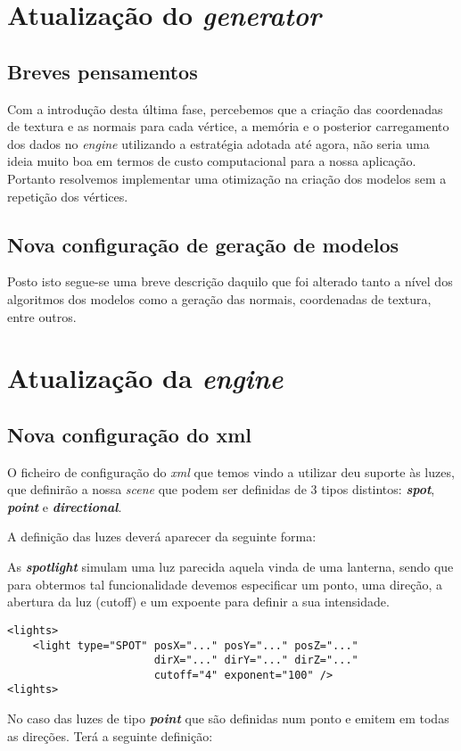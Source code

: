 \documentclass[11pt,a4paper]{report}
\begin{document}
\chapter{Atualização do \emph{generator}}
\section{Breves pensamentos}
Com a introdução desta última fase, percebemos que a criação das coordenadas de textura e as normais para cada vértice, a memória e o posterior carregamento dos dados no \emph{engine} utilizando a estratégia adotada até agora, não seria uma ideia muito boa em termos de custo computacional para a nossa aplicação. Portanto resolvemos implementar uma otimização na criação dos modelos sem a repetição dos vértices.
\section{Nova configuração de geração de modelos}

Posto isto segue-se uma breve descrição daquilo que foi alterado tanto a nível dos algoritmos dos modelos como a geração das normais, coordenadas de textura, entre outros.

\chapter{Atualização da \emph{engine}}

\section{Nova configuração do xml}
O ficheiro de configuração do \emph{xml} que temos vindo a utilizar deu suporte às luzes, que definirão a nossa \emph{scene} que podem ser definidas de 3 tipos distintos: \textbf{\emph{spot}}, \textbf{ \emph{point}} e \textbf{\emph{directional}}.

A definição das luzes deverá aparecer da seguinte forma: 

As \textbf{\emph{spotlight}} simulam uma luz parecida aquela vinda de uma lanterna, sendo que para obtermos tal funcionalidade devemos especificar um ponto, uma direção, a abertura da luz (cutoff) e um expoente para definir a sua intensidade.

\begin{lstlisting}[style = xml]
<lights>
    <light type="SPOT" posX="..." posY="..." posZ="..."
                       dirX="..." dirY="..." dirZ="..."
                       cutoff="4" exponent="100" />
<lights>
\end{lstlisting}
No caso das luzes de tipo \textbf{ \emph{point}} que são definidas num ponto e emitem em todas as direções. Terá a seguinte definição:
\end{document}
